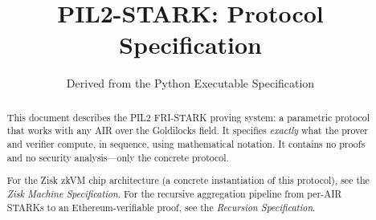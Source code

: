 \documentclass[11pt,a4paper]{article}
\title{PIL2-STARK: Protocol Specification}
\author{Derived from the Python Executable Specification}
\date{}
\begin{document}
\maketitle

\begin{abstract}
This document describes the PIL2 FRI-STARK proving system:
a parametric protocol that works with any AIR over the Goldilocks field.
It specifies \emph{exactly} what the prover and verifier compute, in sequence,
using mathematical notation.
It contains no proofs and no security analysis---only the concrete protocol.

For the Zisk zkVM chip architecture (a concrete instantiation of this protocol),
see the \emph{Zisk Machine Specification}.
For the recursive aggregation pipeline from per-AIR STARKs to an
Ethereum-verifiable proof, see the \emph{Recursion Specification}.
\end{abstract}

\tableofcontents
\newpage



\appendix

\end{document}
